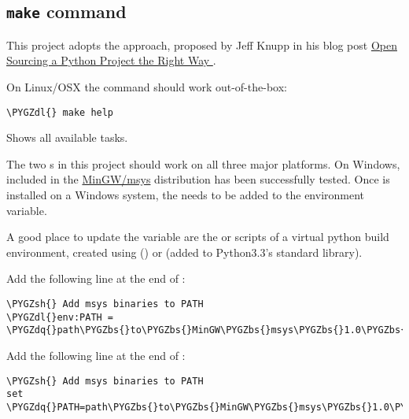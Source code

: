 \documentclass[letterpaper,10pt,english]{sphinxmanual}
\def\PYGZbs{\char`\\}
\def\PYGZsh{\char`\#}
\def\PYGZpc{\char`\%}
\def\PYGZdl{\char`\$}
\def\PYGZdq{\char`\"}
\begin{document}
\subsection{\texttt{make} command}
\label{contributing:make-command}
This project adopts the  approach, proposed by Jeff Knupp in his
blog post \href{http://www.jeffknupp.com/blog/2013/08/16/open-sourcing-a-python-project-the-right-way/}{Open Sourcing a Python Project the Right Way }.

On Linux/OSX the  command should work out-of-the-box:

\begin{Verbatim}[commandchars=\\\{\}]
\PYGZdl{} make help
\end{Verbatim}

Shows all available tasks.

The two  s in this project should work on all three major platforms.
On Windows,  included in the \href{http://sourceforge.net/projects/mingw/files/Installer/mingw-get-setup.exe/download}{MinGW/msys}
distribution has been successfully tested. Once  is installed
on a Windows system, the  needs to be added to
the  environment variable.

A good place to update the  variable are the  or
 scripts of a virtual python build environment, created using
 () or  (added to Python3.3's standard
library).

Add the following line at the end of :

\begin{Verbatim}[commandchars=\\\{\}]
\PYGZsh{} Add msys binaries to PATH
\PYGZdl{}env:PATH = \PYGZdq{}path\PYGZbs{}to\PYGZbs{}MinGW\PYGZbs{}msys\PYGZbs{}1.0\PYGZbs{}bin;\PYGZdl{}env:PATH\PYGZdq{}
\end{Verbatim}

Add the following line at the end of :

\begin{Verbatim}[commandchars=\\\{\}]
\PYGZsh{} Add msys binaries to PATH
set \PYGZdq{}PATH=path\PYGZbs{}to\PYGZbs{}MinGW\PYGZbs{}msys\PYGZbs{}1.0\PYGZbs{}bin;\PYGZpc{}PATH\PYGZpc{}\PYGZdq{}
\end{Verbatim}
\end{document}
